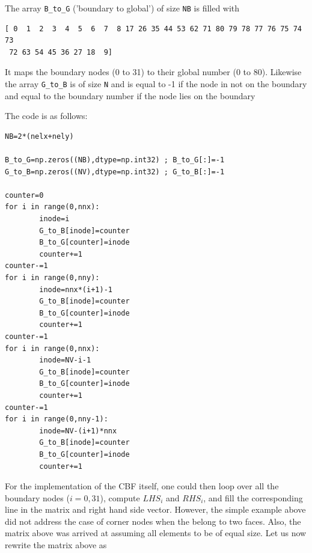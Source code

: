 The array \lstinline{B_to_G} ('boundary to global') 
of size \lstinline{NB} is filled with
\begin{lstlisting}
[ 0  1  2  3  4  5  6  7  8 17 26 35 44 53 62 71 80 79 78 77 76 75 74 73
 72 63 54 45 36 27 18  9]
\end{lstlisting}
It maps the {\color{brown} boundary nodes} (0 to 31) 
to their {\color{teal} global number} (0 to 80).
Likewise the array \lstinline{G_to_B} is of size \lstinline{N} 
and is equal to -1 if the node in not on the boundary and equal 
to the  {\color{brown} boundary number} if the node lies on the boundary

The code is as follows:
\begin{lstlisting}
NB=2*(nelx+nely)

B_to_G=np.zeros((NB),dtype=np.int32) ; B_to_G[:]=-1
G_to_B=np.zeros((NV),dtype=np.int32) ; G_to_B[:]=-1

counter=0
for i in range(0,nnx): 
        inode=i
        G_to_B[inode]=counter
        B_to_G[counter]=inode
        counter+=1
counter-=1
for i in range(0,nny):
        inode=nnx*(i+1)-1
        G_to_B[inode]=counter
        B_to_G[counter]=inode
        counter+=1
counter-=1
for i in range(0,nnx): 
        inode=NV-i-1
        G_to_B[inode]=counter
        B_to_G[counter]=inode
        counter+=1
counter-=1
for i in range(0,nny-1):
        inode=NV-(i+1)*nnx
        G_to_B[inode]=counter
        B_to_G[counter]=inode
        counter+=1
\end{lstlisting}





For the implementation of the CBF itself, one could then loop over
all the boundary nodes ($i=0,31$), compute $LHS_i$ and $RHS_i$, 
and fill the corresponding line in the matrix and right hand side vector.
However, the simple example above did not address the case of corner nodes
when the belong to two faces.
Also, the matrix above was arrived at assuming all elements to be of equal size. 
Let us now rewrite the matrix above as

